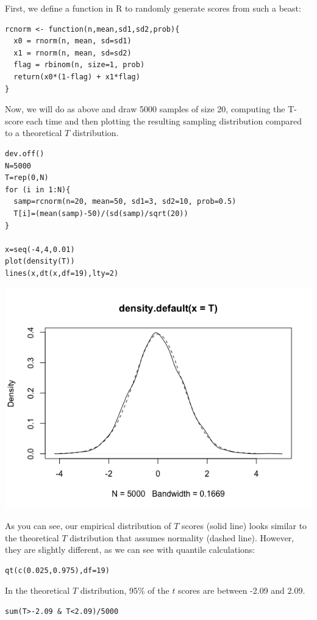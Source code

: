 \documentclass[11pt]{article}
\begin{document}
First, we define a function in R to randomly generate scores from such a beast:

\begin{verbatim}
rcnorm <- function(n,mean,sd1,sd2,prob){
  x0 = rnorm(n, mean, sd=sd1)
  x1 = rnorm(n, mean, sd=sd2)
  flag = rbinom(n, size=1, prob)
  return(x0*(1-flag) + x1*flag)
}
\end{verbatim}

Now, we will do as above and draw 5000 samples of size 20, computing the T-score each time and then plotting the resulting sampling distribution compared to a theoretical $T$ distribution.

\begin{verbatim}
dev.off()
N=5000
T=rep(0,N)
for (i in 1:N){
  samp=rcnorm(n=20, mean=50, sd1=3, sd2=10, prob=0.5)
  T[i]=(mean(samp)-50)/(sd(samp)/sqrt(20))
}

x=seq(-4,4,0.01)
plot(density(T))
lines(x,dt(x,df=19),lty=2)
\end{verbatim}

\includegraphics[width=.9\linewidth]{figures/week3/contaminated.png}

As you can see, our empirical distribution of $T$ scores (solid line) looks similar to the theoretical $T$ distribution that assumes normality (dashed line).  However, they are slightly different, as we can see with quantile calculations:

\begin{verbatim}
qt(c(0.025,0.975),df=19)
\end{verbatim}

In the theoretical $T$ distribution, 95\% of the $t$ scores are between -2.09 and 2.09.

\begin{verbatim}
sum(T>-2.09 & T<2.09)/5000
\end{verbatim}
\end{document}
